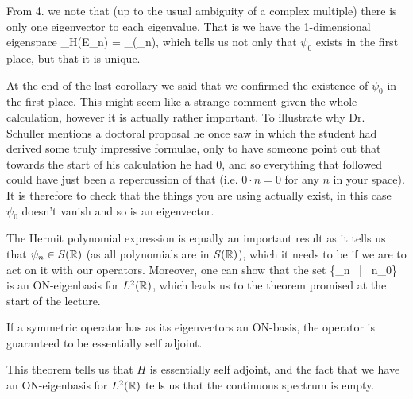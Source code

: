 \bc 
From 4. we note that (up to the usual ambiguity of a complex multiple) there is only one eigenvector to each eigenvalue. That is we have the 1-dimensional eigenspace
\bse 
{}_{H}(E_n) = _{\C}(\psi_n),
\ese 
which tells us not only that $\psi_0$ exists in the first place, but that it is unique. 
\ec 

\br
At the end of the last corollary we said that we confirmed the existence of $\psi_0$ in the first place. This might seem like a strange comment given the whole calculation, however it is actually rather important. To illustrate why Dr. Schuller mentions a doctoral proposal he once saw in which the student had derived some truly impressive formulae, only to have someone point out that towards the start of his calculation he had 0, and so everything that followed could have just been a repercussion of that (i.e. $0\cdot n = 0$ for any $n$ in your space). It is therefore to check that the things you are using actually exist, in this case $\psi_0$ doesn't vanish and so is an eigenvector. 
\er 

The Hermit polynomial expression is equally an important result as it tells us that $\psi_n\in S(\mathbb{R})$ (as all polynomials are in $S(\mathbb{R})$), which it needs to be if we are to act on it with our operators. Moreover, one can show that the set 
\bse 
\{\psi_n \, | \, n\in\N_0\}
\ese 
is an ON-eigenbasis for $L^2(\mathbb{R})$, which leads us to the theorem promised at the start of the lecture.

\bt 
If a symmetric operator has as its eigenvectors an ON-basis, the operator is guaranteed to be essentially self adjoint. 
\et 

This theorem tells us that $H$ is essentially self adjoint, and the fact that we have an ON-eigenbasis for $L^2(\mathbb{R})$ tells us that the continuous spectrum is empty. 